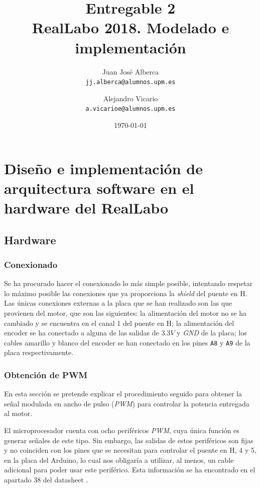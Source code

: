 \documentclass[a4paper]{article}
\begin{document}
\title{Entregable 2 \\
\large RealLabo 2018. Modelado e implementación}
\author{
	Juan José Alberca\\
	\texttt{jj.alberca@alumnos.upm.es}
	\and
	Alejandro Vicario\\
	\texttt{a.vicarioe@alumnos.upm.es}
}
\date{\today}


\maketitle


\section{Diseño e implementación de arquitectura software en el hardware del RealLabo}
\subsection{Hardware}

\subsubsection{Conexionado}
Se ha procurado hacer el conexionado lo más simple posible, intentando respetar lo máximo posible las conexiones que ya proporciona la \emph{shield} del puente en H.
Las únicas conexiones externas a la placa que se han realizado son las que provienen del motor, que son las siguientes:
la alimentación del motor no se ha cambiado y se encuentra en el canal 1 del puente en H;
la alimentación del encoder se ha conectado a alguna de las salidas de $3.3V$ y \emph{GND} de la placa;
los cables amarillo y blanco del encoder se han conectado en los pines \texttt{A8} y \texttt{A9} de la placa respectivamente.

\subsubsection{Obtención de PWM}
En esta sección se pretende explicar el procedimiento seguido para obtener la señal modulada en ancho de pulso (\emph{PWM}) para controlar la potencia entregada al motor.

El microprocesador cuenta con ocho periféricos \emph{PWM}, cuya única función es generar señales de este tipo. Sin embargo,
las salidas de estos periféricos son fijas y no coinciden con los pines que se necesitan para controlar el puente en H, 4 y 5, en la placa del Arduino,
lo cual nos obligaría a utilizar, al menos, un cable adicional para poder usar este periférico. Esta información se ha encontrado en el apartado 38 del datasheet \cite{SAM3X/A}.
\end{document}
